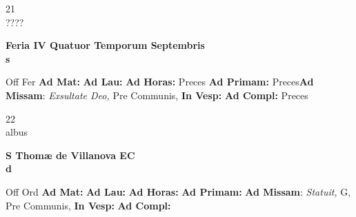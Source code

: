 \documentclass[10pt, openany]{book}
\begin{document}
    \begin{center}
        \begin{minipage}{3.5in}
            \vspace{2em}
            \begin{minipage}{0.5in}
                {\Huge 21} \\
                {\normalsize ????}
            \end{minipage}
            \begin{minipage}{3.0in}
                \textbf{ \large Feria IV Quatuor Temporum Septembris \\
                \textnormal{\normalsize s}}

            \end{minipage}
            \begin{justify}Off Fer
                \textbf{Ad Mat: }
                \textbf{Ad Lau: }
                \textbf{Ad Horas: }Preces
                \textbf{Ad Primam: }Preces\textbf{Ad Missam}: \textit{Exsultate Deo,} Pre Communis, 
                \textbf{In Vesp: }
                \textbf{Ad Compl: }Preces
            \end{justify}
        \end{minipage}
    \end{center}

    \begin{center}
        \begin{minipage}{3.5in}
            \vspace{2em}
            \begin{minipage}{0.5in}
                {\Huge 22} \\
                {\normalsize albus}
            \end{minipage}
            \begin{minipage}{3.0in}
                \textbf{ \large S Thomæ de Villanova EC \\
                \textnormal{\normalsize d}}

            \end{minipage}
            \begin{justify}Off Ord
                \textbf{Ad Mat: }
                \textbf{Ad Lau: }
                \textbf{Ad Horas: }
                \textbf{Ad Primam: }\textbf{Ad Missam}: \textit{Statuit,} G, Pre Communis, 
                \textbf{In Vesp: }
                \textbf{Ad Compl: }
            \end{justify}
        \end{minipage}
    \end{center}
\end{document}
